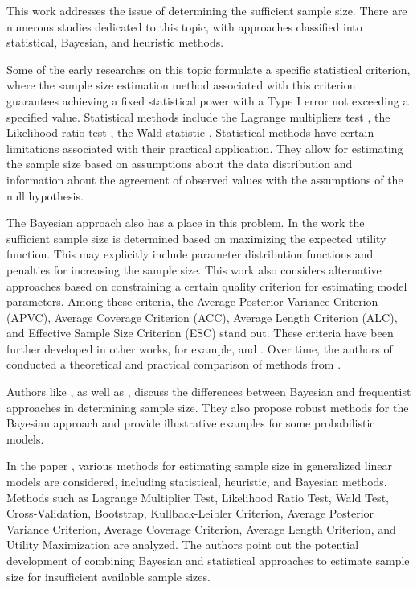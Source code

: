 \documentclass[runningheads]{llncs}
\begin{document}
This work addresses the issue of determining the sufficient sample size. There are numerous studies dedicated to this topic, with approaches classified into statistical, Bayesian, and heuristic methods.

Some of the early researches on this topic \cite{Adcock1988,Joseph1995} formulate a specific statistical criterion, where the sample size estimation method associated with this criterion guarantees achieving a fixed statistical power with a Type I error not exceeding a specified value. Statistical methods include the Lagrange multipliers test \cite{self1988power}, the Likelihood ratio test \cite{shieh2000power}, the Wald statistic \cite{shieh2005power}. Statistical methods have certain limitations associated with their practical application. They allow for estimating the sample size based on assumptions about the data distribution and information about the agreement of observed values with the assumptions of the null hypothesis.

The Bayesian approach also has a place in this problem. In the work \cite{Lindley1997} the sufficient sample size is determined based on maximizing the expected utility function. This may explicitly include parameter distribution functions and penalties for increasing the sample size. This work also considers alternative approaches based on constraining a certain quality criterion for estimating model parameters. Among these criteria, the Average Posterior Variance Criterion (APVC), Average Coverage Criterion (ACC), Average Length Criterion (ALC), and Effective Sample Size Criterion (ESC) stand out. These criteria have been further developed in other works, for example, \cite{PhamGia1997} and \cite{Gelfand2002}. Over time, the authors of \cite{Cao2009} conducted a theoretical and practical comparison of methods from \cite{Adcock1988,Joseph1995,Lindley1997}.

Authors like \cite{Brutti2014}, as well as \cite{Pezeshk2008}, discuss the differences between Bayesian and frequentist approaches in determining sample size. They also propose robust methods for the Bayesian approach and provide illustrative examples for some probabilistic models.

In the paper \cite{Grabovoy2022}, various methods for estimating sample size in generalized linear models are considered, including statistical, heuristic, and Bayesian methods. Methods such as Lagrange Multiplier Test, Likelihood Ratio Test, Wald Test, Cross-Validation, Bootstrap, Kullback-Leibler Criterion, Average Posterior Variance Criterion, Average Coverage Criterion, Average Length Criterion, and Utility Maximization are analyzed. The authors point out the potential development of combining Bayesian and statistical approaches to estimate sample size for insufficient available sample sizes.
\end{document}
